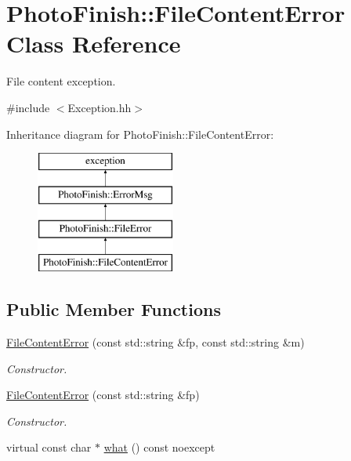 \hypertarget{class_photo_finish_1_1_file_content_error}{}\section{Photo\+Finish\+:\+:File\+Content\+Error Class Reference}
\label{class_photo_finish_1_1_file_content_error}


File content exception.  




{\ttfamily \#include $<$Exception.\+hh$>$}

Inheritance diagram for Photo\+Finish\+:\+:File\+Content\+Error\+:\begin{figure}[H]
\begin{center}
\leavevmode
\includegraphics[height=4.000000cm]{class_photo_finish_1_1_file_content_error}
\end{center}
\end{figure}
\subsection*{Public Member Functions}
\begin{DoxyCompactItemize}
\item 
\hyperlink{class_photo_finish_1_1_file_content_error_a7a4c7a66b0f98ad1aecbf91313bfcb95}{File\+Content\+Error} (const std\+::string \&fp, const std\+::string \&m)
\begin{DoxyCompactList}\small\item\em Constructor. \end{DoxyCompactList}\item 
\hyperlink{class_photo_finish_1_1_file_content_error_ad4f4a9cb13ac4a75885b8d69ed18e672}{File\+Content\+Error} (const std\+::string \&fp)
\begin{DoxyCompactList}\small\item\em Constructor. \end{DoxyCompactList}\item 
virtual const char $\ast$ \hyperlink{class_photo_finish_1_1_file_content_error_a20d98434ca93caa0350503e224d8675e}{what} () const noexcept
\end{DoxyCompactItemize}
